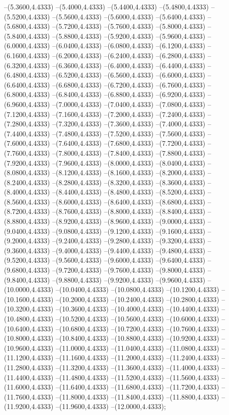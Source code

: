{	--(5.3600,4.4333)
	--(5.4000,4.4333)
	--(5.4400,4.4333)
	--(5.4800,4.4333)
	--(5.5200,4.4333)
	--(5.5600,4.4333)
	--(5.6000,4.4333)
	--(5.6400,4.4333)
	--(5.6800,4.4333)
	--(5.7200,4.4333)
	--(5.7600,4.4333)
	--(5.8000,4.4333)
	--(5.8400,4.4333)
	--(5.8800,4.4333)
	--(5.9200,4.4333)
	--(5.9600,4.4333)
	--(6.0000,4.4333)
	--(6.0400,4.4333)
	--(6.0800,4.4333)
	--(6.1200,4.4333)
	--(6.1600,4.4333)
	--(6.2000,4.4333)
	--(6.2400,4.4333)
	--(6.2800,4.4333)
	--(6.3200,4.4333)
	--(6.3600,4.4333)
	--(6.4000,4.4333)
	--(6.4400,4.4333)
	--(6.4800,4.4333)
	--(6.5200,4.4333)
	--(6.5600,4.4333)
	--(6.6000,4.4333)
	--(6.6400,4.4333)
	--(6.6800,4.4333)
	--(6.7200,4.4333)
	--(6.7600,4.4333)
	--(6.8000,4.4333)
	--(6.8400,4.4333)
	--(6.8800,4.4333)
	--(6.9200,4.4333)
	--(6.9600,4.4333)
	--(7.0000,4.4333)
	--(7.0400,4.4333)
	--(7.0800,4.4333)
	--(7.1200,4.4333)
	--(7.1600,4.4333)
	--(7.2000,4.4333)
	--(7.2400,4.4333)
	--(7.2800,4.4333)
	--(7.3200,4.4333)
	--(7.3600,4.4333)
	--(7.4000,4.4333)
	--(7.4400,4.4333)
	--(7.4800,4.4333)
	--(7.5200,4.4333)
	--(7.5600,4.4333)
	--(7.6000,4.4333)
	--(7.6400,4.4333)
	--(7.6800,4.4333)
	--(7.7200,4.4333)
	--(7.7600,4.4333)
	--(7.8000,4.4333)
	--(7.8400,4.4333)
	--(7.8800,4.4333)
	--(7.9200,4.4333)
	--(7.9600,4.4333)
	--(8.0000,4.4333)
	--(8.0400,4.4333)
	--(8.0800,4.4333)
	--(8.1200,4.4333)
	--(8.1600,4.4333)
	--(8.2000,4.4333)
	--(8.2400,4.4333)
	--(8.2800,4.4333)
	--(8.3200,4.4333)
	--(8.3600,4.4333)
	--(8.4000,4.4333)
	--(8.4400,4.4333)
	--(8.4800,4.4333)
	--(8.5200,4.4333)
	--(8.5600,4.4333)
	--(8.6000,4.4333)
	--(8.6400,4.4333)
	--(8.6800,4.4333)
	--(8.7200,4.4333)
	--(8.7600,4.4333)
	--(8.8000,4.4333)
	--(8.8400,4.4333)
	--(8.8800,4.4333)
	--(8.9200,4.4333)
	--(8.9600,4.4333)
	--(9.0000,4.4333)
	--(9.0400,4.4333)
	--(9.0800,4.4333)
	--(9.1200,4.4333)
	--(9.1600,4.4333)
	--(9.2000,4.4333)
	--(9.2400,4.4333)
	--(9.2800,4.4333)
	--(9.3200,4.4333)
	--(9.3600,4.4333)
	--(9.4000,4.4333)
	--(9.4400,4.4333)
	--(9.4800,4.4333)
	--(9.5200,4.4333)
	--(9.5600,4.4333)
	--(9.6000,4.4333)
	--(9.6400,4.4333)
	--(9.6800,4.4333)
	--(9.7200,4.4333)
	--(9.7600,4.4333)
	--(9.8000,4.4333)
	--(9.8400,4.4333)
	--(9.8800,4.4333)
	--(9.9200,4.4333)
	--(9.9600,4.4333)
	--(10.0000,4.4333)
	--(10.0400,4.4333)
	--(10.0800,4.4333)
	--(10.1200,4.4333)
	--(10.1600,4.4333)
	--(10.2000,4.4333)
	--(10.2400,4.4333)
	--(10.2800,4.4333)
	--(10.3200,4.4333)
	--(10.3600,4.4333)
	--(10.4000,4.4333)
	--(10.4400,4.4333)
	--(10.4800,4.4333)
	--(10.5200,4.4333)
	--(10.5600,4.4333)
	--(10.6000,4.4333)
	--(10.6400,4.4333)
	--(10.6800,4.4333)
	--(10.7200,4.4333)
	--(10.7600,4.4333)
	--(10.8000,4.4333)
	--(10.8400,4.4333)
	--(10.8800,4.4333)
	--(10.9200,4.4333)
	--(10.9600,4.4333)
	--(11.0000,4.4333)
	--(11.0400,4.4333)
	--(11.0800,4.4333)
	--(11.1200,4.4333)
	--(11.1600,4.4333)
	--(11.2000,4.4333)
	--(11.2400,4.4333)
	--(11.2800,4.4333)
	--(11.3200,4.4333)
	--(11.3600,4.4333)
	--(11.4000,4.4333)
	--(11.4400,4.4333)
	--(11.4800,4.4333)
	--(11.5200,4.4333)
	--(11.5600,4.4333)
	--(11.6000,4.4333)
	--(11.6400,4.4333)
	--(11.6800,4.4333)
	--(11.7200,4.4333)
	--(11.7600,4.4333)
	--(11.8000,4.4333)
	--(11.8400,4.4333)
	--(11.8800,4.4333)
	--(11.9200,4.4333)
	--(11.9600,4.4333)
	--(12.0000,4.4333);
}
